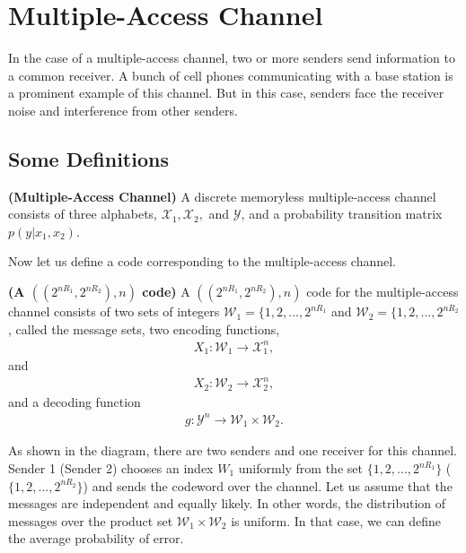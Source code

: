 \section{Multiple-Access Channel}
In the case of a multiple-access channel, two or more senders send information to a common receiver. A bunch of cell phones communicating with a base station is a prominent example of this channel. But in this case, senders face the receiver noise and interference from other senders.
%
\subsection{Some Definitions}
%
\begin{tcolorbox}[boxrule=0pt,frame hidden,sharp corners,enhanced, opacityback=0, borderline west={2pt}{0pt}{red}]
\begin{defn} \textbf{(Multiple-Access Channel)} A discrete memoryless multiple-access channel consists of three alphabets, $\mathcal{X}_1, \mathcal{X}_2,$ and $\mathcal{Y}$, and a probability transition matrix $p(y|x_1,x_2)$.
\end{defn}
\end{tcolorbox}
%
Now let us define a code corresponding to the multiple-access channel.
%
\begin{tcolorbox}[boxrule=0pt,frame hidden,sharp corners,enhanced, opacityback=0, borderline west={2pt}{0pt}{red}]
\begin{defn} \textbf{(A $((2^{nR_1},2^{nR_2}),n)$ code)} A $((2^{nR_1},2^{nR_2}),n)$ code for the multiple-access channel consists of two sets of integers $\mathcal{W}_1 = \{1,2,...,2^{nR_1}$ and $\mathcal{W}_2 = \{1,2,...,2^{nR_2}$, called the message sets, two encoding functions,
%
\begin{eqnarray}
    X_1: \mathcal{W}_1 \rightarrow \mathcal{X}_1^n,
\end{eqnarray}
%
and
%
\begin{eqnarray}
    X_2: \mathcal{W}_2 \rightarrow \mathcal{X}_2^n,
\end{eqnarray}
%
and a decoding function
\begin{eqnarray}
    g: \mathcal{Y}^n \rightarrow \mathcal{W}_1 \times \mathcal{W}_2.
\end{eqnarray}
%
\end{defn}
\end{tcolorbox}
%
As shown in the diagram, there are two senders and one receiver for this channel. Sender 1 (Sender 2) chooses an index $W_1$ uniformly from the set $\{1,2,...,2^{nR_1}\}$ ($\{1,2,...,2^{nR_2}\}$) and sends the codeword over the channel. Let us assume that the messages are independent and equally likely. In other words, the distribution of messages over the product set $\mathcal{W}_1 \times \mathcal{W}_2$ is uniform. In that case, we can define the average probability of error.
